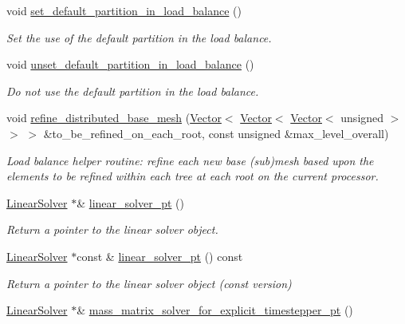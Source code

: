 \begin{DoxyCompactItemize}
void \hyperlink{classoomph_1_1Problem_a23e641f64f436d4911c53c0f5c7ff239}{set\+\_\+default\+\_\+partition\+\_\+in\+\_\+load\+\_\+balance} ()
\begin{DoxyCompactList}\small\item\em Set the use of the default partition in the load balance. \end{DoxyCompactList}\item 
void \hyperlink{classoomph_1_1Problem_a1157876a05d112d523be03d9c30464de}{unset\+\_\+default\+\_\+partition\+\_\+in\+\_\+load\+\_\+balance} ()
\begin{DoxyCompactList}\small\item\em Do not use the default partition in the load balance. \end{DoxyCompactList}\item 
void \hyperlink{classoomph_1_1Problem_ac969abcf440b4f631061e74316391b3a}{refine\+\_\+distributed\+\_\+base\+\_\+mesh} (\hyperlink{classoomph_1_1Vector}{Vector}$<$ \hyperlink{classoomph_1_1Vector}{Vector}$<$ \hyperlink{classoomph_1_1Vector}{Vector}$<$ unsigned $>$ $>$ $>$ \&to\+\_\+be\+\_\+refined\+\_\+on\+\_\+each\+\_\+root, const unsigned \&max\+\_\+level\+\_\+overall)
\begin{DoxyCompactList}\small\item\em Load balance helper routine\+: refine each new base (sub)mesh based upon the elements to be refined within each tree at each root on the current processor. \end{DoxyCompactList}\item 
\hyperlink{classoomph_1_1LinearSolver}{Linear\+Solver} $\ast$\& \hyperlink{classoomph_1_1Problem_a27df2f59b7e602251fb5b687821a8aee}{linear\+\_\+solver\+\_\+pt} ()
\begin{DoxyCompactList}\small\item\em Return a pointer to the linear solver object. \end{DoxyCompactList}\item 
\hyperlink{classoomph_1_1LinearSolver}{Linear\+Solver} $\ast$const  \& \hyperlink{classoomph_1_1Problem_a50b5365e0de1212b9c07f41ae9deab5a}{linear\+\_\+solver\+\_\+pt} () const
\begin{DoxyCompactList}\small\item\em Return a pointer to the linear solver object (const version) \end{DoxyCompactList}\item 
\hyperlink{classoomph_1_1LinearSolver}{Linear\+Solver} $\ast$\& \hyperlink{classoomph_1_1Problem_af40d864609f3c2b85cab8fb9fadc439d}{mass\+\_\+matrix\+\_\+solver\+\_\+for\+\_\+explicit\+\_\+timestepper\+\_\+pt} ()

\end{DoxyCompactItemize}

